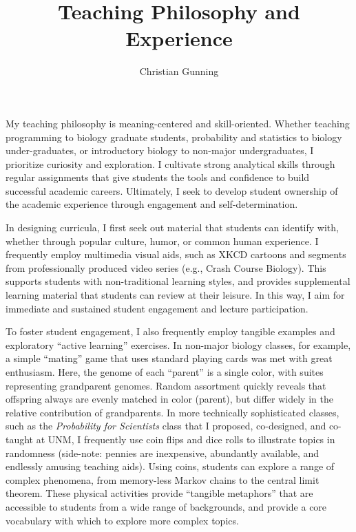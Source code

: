 \documentclass[12pt]{article}
\author{Christian Gunning}
\title{Teaching Philosophy and Experience}
\begin{document}
\maketitle
\thispagestyle{empty}
\linespread{1.25}\selectfont


My teaching philosophy is meaning-centered and skill-oriented.  Whether teaching
programming to biology graduate students, probability and statistics to biology
under-graduates, or introductory biology to non-major undergraduates, I
prioritize curiosity and exploration.  I cultivate strong analytical skills
through regular assignments that give students the tools and confidence to build
successful academic careers. Ultimately, I seek to develop student ownership of
the academic experience through engagement and self-determination.

In designing curricula, I first seek out material that students can identify with,
whether through popular culture, humor, or common human experience.  I
frequently employ multimedia visual aids, such as XKCD cartoons and segments
from professionally produced video series (e.g., Crash Course Biology).  This
supports students with non-traditional learning styles, and provides
supplemental learning material that students can review at their leisure. In
this way, I aim for immediate and sustained student engagement and lecture 
participation.

To foster student engagement, I also frequently employ
 tangible examples and exploratory ``active learning'' exercises.
In non-major biology classes, for example, a simple 
``mating'' game that uses standard playing cards was met 
with great enthusiasm.  Here, the genome of each ``parent'' 
is a single color, with suites representing grandparent genomes.
Random assortment quickly reveals that offspring always are
evenly matched in color (parent), but differ widely in the 
relative contribution of grandparents.  In more technically
sophisticated classes, such as the {\em Probability for Scientists}
class that I proposed, co-designed, and co-taught at UNM,
I frequently use coin flips and dice rolls to
illustrate topics in randomness (side-note: 
pennies are inexpensive, abundantly available, and endlessly 
amusing teaching aids).
Using coins, students can explore a range 
of complex phenomena, from memory-less Markov chains to the 
central limit theorem.  These physical activities provide
``tangible metaphors'' that are 
accessible to students from a wide range of backgrounds, 
and provide a core vocabulary with which to explore more 
complex topics.
\end{document}
